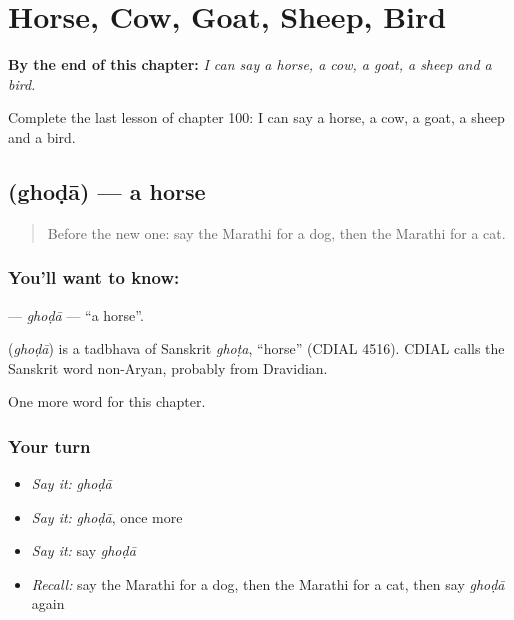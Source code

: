 
\chapter{Horse, Cow, Goat, Sheep, Bird}
\label{ch:mr-horse-cow-goat-sheep-bird}

\begin{chapteropening}
\textbf{By the end of this chapter:} \emph{I can say a horse, a cow, a goat, a sheep and a bird.}

Complete the last lesson of chapter 100: I can say a horse, a cow, a goat, a sheep and a bird.
\end{chapteropening}

\section[\texorpdfstring{\mr{घोडा} (ghoḍā)}{घोडा (ghoḍā)}]{ (ghoḍā) — a horse}

\label{lesson:MR-C100-ghoda}



\begin{quote}
Before the new one: say the Marathi for a dog, then the Marathi for a cat.
\end{quote}

\subsection*{You'll want to know: }
\textbf{} — \emph{ghoḍā} — \textquotedblleft{}a horse\textquotedblright{}.

\begin{cousinweb}
\textbf{} (\emph{ghoḍā}) is a tadbhava of Sanskrit \emph{ghoṭa}, \textquotedblleft{}horse\textquotedblright{} (CDIAL 4516). CDIAL calls the Sanskrit word non-Aryan, probably from Dravidian.
\end{cousinweb}

\begin{grammarlens}[title={What you've built}]
One more word for this chapter.
\end{grammarlens}

\subsection*{Your turn}
\begin{itemize}
\raggedright
  \item \emph{Say it:} \emph{ghoḍā}
  \item \emph{Say it:} \emph{ghoḍā}, once more
  \item \emph{Say it:} say \emph{ghoḍā}
  \item \emph{Recall:} say the Marathi for a dog, then the Marathi for a cat, then say \emph{ghoḍā} again
\end{itemize}

